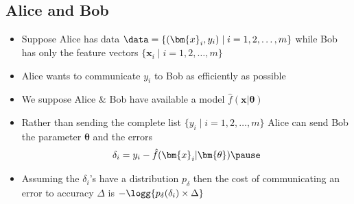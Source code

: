 \begin{slide}
\section{Alice and Bob}
  
\begin{PauseHighLight}
  \begin{itemize}
  \item Suppose Alice has data
    $\data=\{(\bm{x}_i,y_i) \mid i=1,2,\ldots,m\}$ while Bob  has only  the
    feature vectors $\{\bm{x}_i \mid i=1,2,\ldots,m\}$\pause
  \item Alice wants to communicate $y_i$ to Bob as efficiently as
    possible\pause
  \item We suppose Alice \& Bob have available a model
    $\hat{f}(\bm{x}|\bm{\theta})$\pause
  \item Rather than sending the complete list $\{y_i \mid
      i=1,2,\ldots,m\}$ Alice can send Bob the parameter
      $\bm{\theta}$ and the errors
      \begin{align*}
        \delta_i = y_i - \hat{f}(\bm{x}_i|\bm{\theta})\pause
      \end{align*}
    \item Assuming the $\delta_i$'s have a distribution $p_\delta$
      then the cost of communicating an error to accuracy $\Delta$ is
      $-\logg{p_\delta(\delta_i)\times\Delta}$\pause
  \end{itemize}
\end{PauseHighLight}

\end{slide}


